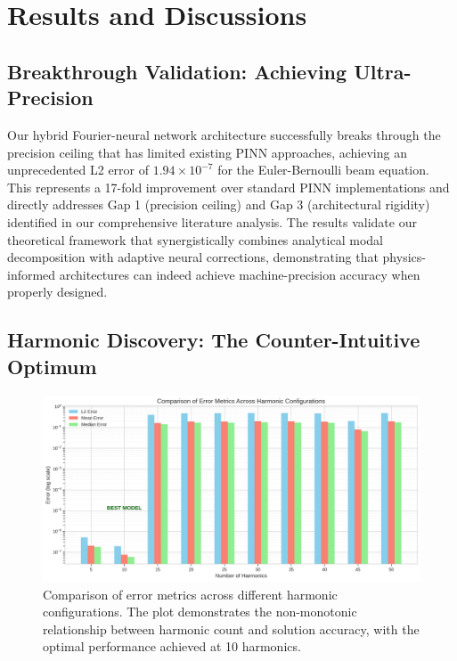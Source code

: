 \section{Results and Discussions}

\subsection{Breakthrough Validation: Achieving Ultra-Precision}

Our hybrid Fourier-neural network architecture successfully breaks through the precision ceiling that has limited existing PINN approaches, achieving an unprecedented L2 error of $1.94 \times 10^{-7}$ for the Euler-Bernoulli beam equation. This represents a 17-fold improvement over standard PINN implementations and directly addresses Gap 1 (precision ceiling) and Gap 3 (architectural rigidity) identified in our comprehensive literature analysis. The results validate our theoretical framework that synergistically combines analytical modal decomposition with adaptive neural corrections, demonstrating that physics-informed architectures can indeed achieve machine-precision accuracy when properly designed.

\subsection{Harmonic Discovery: The Counter-Intuitive Optimum}

\begin{figure}[ht]
    \centering
    \includegraphics[width = 1.0\linewidth]{figures/error_metrics_comparison.png}
    \caption{Comparison of error metrics across different harmonic configurations. The plot demonstrates the non-monotonic relationship between harmonic count and solution accuracy, with the optimal performance achieved at 10 harmonics.}
    \label{fig:error_metrics}
\end{figure}

